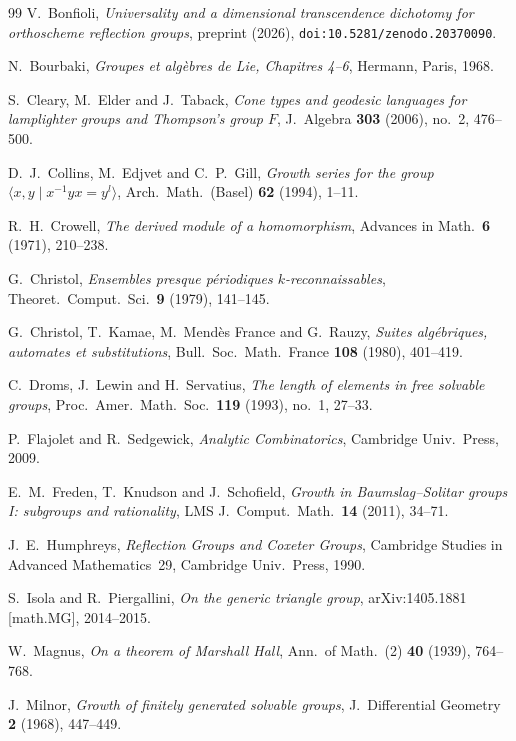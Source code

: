 \documentclass[11pt]{article}
\theoremstyle{plain}
\theoremstyle{definition}
\theoremstyle{remark}
\begin{document}
\begin{thebibliography}{99}
 V.~Bonfioli, \emph{Universality and a dimensional transcendence dichotomy
for orthoscheme reflection groups}, preprint (2026), \texttt{doi:10.5281/zenodo.20370090}.

 N.~Bourbaki, \emph{Groupes et alg\`ebres de Lie, Chapitres 4--6},
Hermann, Paris, 1968.

 S.~Cleary, M.~Elder and J.~Taback, \emph{Cone types and
geodesic languages for lamplighter groups and Thompson's group $F$},
J.\ Algebra \textbf{303} (2006), no.~2, 476--500.

 D.~J.~Collins, M.~Edjvet and C.~P.~Gill, \emph{Growth series for the group
$\langle x,y\mid x^{-1}yx=y^l\rangle$}, Arch.\ Math.\ (Basel) \textbf{62} (1994), 1--11.

 R.~H.~Crowell, \emph{The derived module of a homomorphism},
Advances in Math.\ \textbf{6} (1971), 210--238.

 G.~Christol, \emph{Ensembles presque p\'eriodiques $k$-reconnaissables},
Theoret.\ Comput.\ Sci.\ \textbf{9} (1979), 141--145.

 G.~Christol, T.~Kamae, M.~Mend\`es France and G.~Rauzy,
\emph{Suites alg\'ebriques, automates et substitutions},
Bull.\ Soc.\ Math.\ France \textbf{108} (1980), 401--419.

 C.~Droms, J.~Lewin and H.~Servatius, \emph{The length of elements
in free solvable groups}, Proc.\ Amer.\ Math.\ Soc.\ \textbf{119} (1993),
no.~1, 27--33.

 P.~Flajolet and R.~Sedgewick, \emph{Analytic Combinatorics},
Cambridge Univ.\ Press, 2009.

 E.~M.~Freden, T.~Knudson and J.~Schofield, \emph{Growth in
Baumslag--Solitar groups I: subgroups and rationality}, LMS J.\ Comput.\ Math.\ \textbf{14}
(2011), 34--71.

 J.~E.~Humphreys, \emph{Reflection Groups and Coxeter Groups}, Cambridge
Studies in Advanced Mathematics~29, Cambridge Univ.\ Press, 1990.

 S.~Isola and R.~Piergallini, \emph{On the generic triangle group},
arXiv:1405.1881 [math.MG], 2014--2015.

 W.~Magnus, \emph{On a theorem of Marshall Hall}, Ann.\ of
Math.\ (2) \textbf{40} (1939), 764--768.

 J.~Milnor, \emph{Growth of finitely generated solvable
groups}, J.\ Differential Geometry \textbf{2} (1968), 447--449.


\end{thebibliography}
\end{document}
